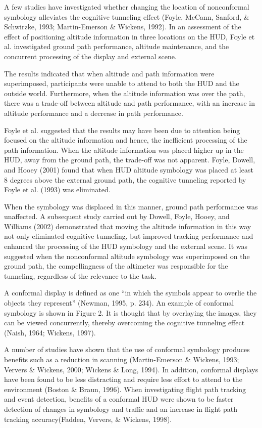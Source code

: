 \documentclass[utf8,bachelor,manualbib]{gradu3}
\begin{document}
A few studies have investigated whether changing the location of nonconformal symbology alleviates the cognitive tunneling effect (Foyle, McCann, Sanford, \& Schwirzke, 1993; Martin-Emerson \& Wickens, 1992). In an assessment of the effect of positioning altitude information in three locations on the HUD, Foyle et al. investigated ground path performance, altitude maintenance, and the concurrent processing of the display and external scene.

The results indicated that when altitude and path information were superimposed, participants were unable to attend to both the HUD and the outside world. Furthermore, when the altitude information was over the path, there was a trade-off between altitude and path performance, with an increase in altitude performance and a decrease in path performance.

Foyle et al. suggested that the results may have been due to attention being focused on the altitude information and hence, the inefficient processing of the path information. When the altitude information was placed higher up in the HUD, away from the ground path, the trade-off was not apparent. Foyle, Dowell, and Hooey (2001) found that when HUD altitude symbology was placed at least 8 degrees above the external ground path, the cognitive tunneling reported by Foyle et al. (1993) was eliminated.

When the symbology was displaced in this manner, ground path performance was unaffected. A subsequent study carried out by Dowell, Foyle, Hooey, and Williams (2002) demonstrated
that moving the altitude information in this way not only eliminated cognitive tunneling, but improved tracking performance and enhanced the processing of the HUD symbology and the external scene. It was suggested when the nonconformal altitude symbology was superimposed on the ground path, the compellingness of the altimeter was responsible for the tunneling, regardless of the relevance to the task.







A conformal display is defined as one “in which the symbols appear to overlie the objects they represent” (Newman, 1995, p. 234). An example of conformal symbology is shown in Figure 2. It is thought that by overlaying the images, they can be viewed concurrently, thereby overcoming the cognitive tunneling effect (Naish, 1964; Wickens, 1997).

A number of studies have shown that the use of conformal symbology produces benefits such as a reduction in scanning (Martin-Emerson \& Wickens, 1993; Ververs \& Wickens, 2000; Wickens \& Long, 1994). In addition, conformal displays have been found to be less distracting and require less effort to attend to the environment (Boston \& Braun, 1996). When investigating flight path tracking and event detection, benefits of a conformal HUD were shown to be faster detection of changes in symbology and traffic and an increase in flight path tracking accuracy(Fadden, Ververs, \& Wickens, 1998). 
\end{document}
